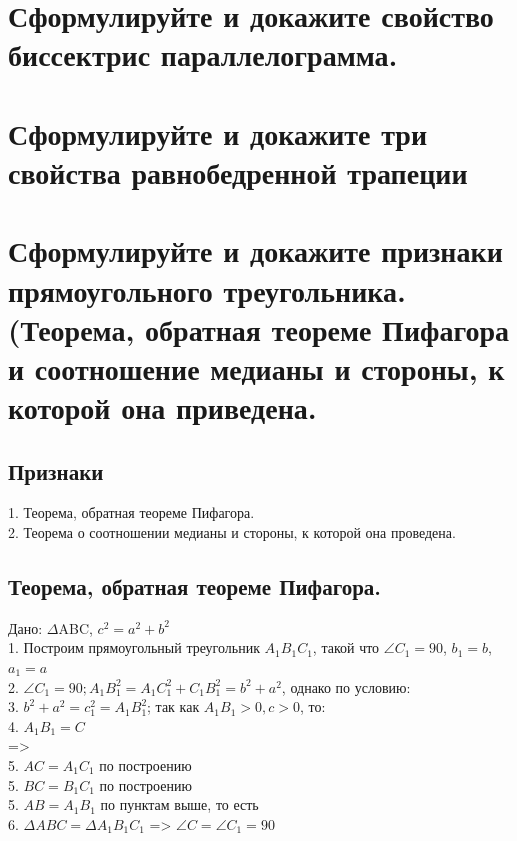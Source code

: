 \documentclass[12pt, letterpaper]{article}
\begin{document}
\section {Сформулируйте и докажите свойство биссектрис параллелограмма.}
\section {Сформулируйте и докажите три свойства равнобедренной трапеции}
\section {Сформулируйте и докажите признаки прямоугольного треугольника. (Теорема, обратная теореме Пифагора и соотношение медианы и стороны, к которой она приведена.}
\subsection{Признаки}
1. Теорема, обратная теореме Пифагора. \\
2. Теорема о соотношении медианы и стороны, к которой она проведена. \\

\subsection{Теорема, обратная теореме Пифагора.}
Дано: $\Delta$ABC, $c^2=a^2+b^2$ \\
1. Построим прямоугольный треугольник $A_1 B_1 C_1$, такой что $\angle C_1 = 90 $, $b_1=b$, $a_1=a$ \\
2. $\angle C_1=90; A_1 B_1^2 = A_1 C_1^2+C_1 B_1^2 = b^2+a^2$, однако по условию:\\
3. $b^2+a^2=c_1^2 = A_1 B_1^2$; так как $A_1 B_1>0, c>0$, то: \\
4. $A_1 B_1 = C$ \\
=> \\
5. $AC = A_1 C_1 $ по построению \\
5. $BC = B_1 C_1 $ по построению \\
5. $AB = A_1 B_1 $ по пунктам выше, то есть \\
6. $\Delta ABC = \Delta A_1 B_1 C_1 $ => $\angle C = \angle C_1 = 90 $ \\
\end{document}
